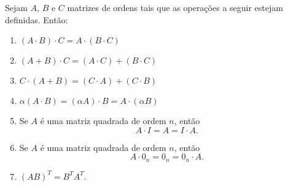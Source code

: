 \begin{proposicao}
	Sejam $A$, $B$ e $C$ matrizes de ordens tais que as operações a seguir estejam definidas. Ent\~ao:
	\begin{enumerate}[label={\roman*})]
		\item $(A\cdot B)\cdot C = A\cdot(B \cdot C)$
		\item $(A + B)\cdot C = (A\cdot C) + (B\cdot C)$
		\item $C\cdot(A + B) = (C\cdot A) + (C\cdot B)$
		\item $\alpha(A\cdot B) = (\alpha A)\cdot B = A \cdot(\alpha B)$
		\item Se $A$ é uma matriz quadrada de ordem $n$, então
			\[A\cdot I = A = I\cdot A.\]
		\item Se $A$ é uma matriz quadrada de ordem $n$, então
			\[A\cdot0_n = 0_n = 0_n\cdot A.\]
		\item $(AB)^T = B^TA^T$.
	\end{enumerate}
\end{proposicao}
